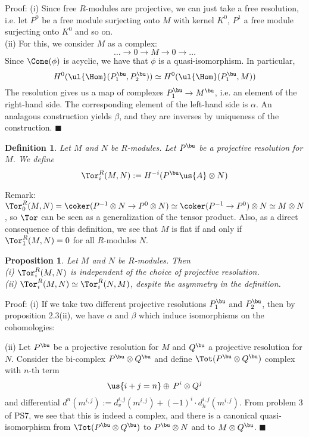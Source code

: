 \documentclass[10 pt]{article}
\newtheorem{prop}{Proposition}[section]
\newtheorem{defn}{Definition}[section]
\newcommand\bdefn{\begin{defn}}
\newcommand\bprop{\begin{prop}}
\newcommand\edefn{\end{defn}}
\newcommand\eprop{\end{prop}}
\begin{document}
Proof: (i) Since free $R$-modules are projective, we can just take a free resolution, i.e. let $P^0$ be a free module surjecting onto $M$ with kernel $K^0$, $P^1$ a free module surjecting onto $K^0$ and so on.\\
(ii) For this, we consider $M$ as a complex:
$$\dots\rightarrow 0\rightarrow M\rightarrow 0\rightarrow \dots$$
Since $\Cone (\phi)$ is acyclic, we have that $\phi$ is a quasi-isomorphism.  In particular,
$$H^0(\ul{\Hom}(P_1^\bu,P_2^\bu))\simeq H^0(\ul{\Hom}(P_1^\bu,M))$$
The resolution gives us a map of complexes $P_1^\bu\rightarrow M^\bu$, i.e. an element of the right-hand side.  The corresponding element of the left-hand side is $\alpha$.  An analagous construction yields $\beta$, and they are inverses by uniqueness of the construction. $\blacksquare$

\bdefn Let $M$ and $N$ be $R$-modules.  Let $P^\bu$ be a projective resolution for $M$.  We define
$$\Tor^R_i(M,N):= H^{-i}(P^\bu\us{A}\otimes N)$$
\edefn

Remark:  $\Tor^R_0(M,N)=\coker(P^{-1}\otimes N\rightarrow P^0\otimes N)\simeq \coker(P^{-1}\rightarrow P^0)\otimes N\simeq M\otimes N$, so $\Tor$ can be seen as a generalization of the tensor product.  Also, as a direct consequence of this definition, we see that $M$ is flat if and only if $\Tor^R_1(M,N)=0$ for all $R$-modules $N$.

\bprop Let $M$ and $N$ be $R$-modules.  Then\\
(i) $\Tor^R_i(M,N)$ is independent of the choice of projective resolution.\\
(ii) $\Tor^R_i(M,N)\simeq\Tor^R_i(N,M)$, despite the asymmetry in the definition.
\eprop

Proof: (i) If we take two different projective resolutions $P_1^\bu$ and $P_2^\bu$, then by proposition 2.3(ii), we have $\alpha$ and $\beta$ which induce isomorphisms on the cohomologies:\\


(ii) Let $P^\bu$ be a projective resolution for $M$ and $Q^\bu$ a projective resolution for $N$.  Consider the bi-complex $P^\bu\otimes Q^\bu$ and define $\Tot(P^\bu\otimes Q^\bu)$ complex with $n$-th term
$$\us{i+j=n}\oplus\, P^i\otimes Q^j $$
and differential $d^n(m^{i,j}):= d_v^{i,j}(m^{i,j})+(-1)^i\cdot d_h^{i,j}(m^{i,j})$.  From problem 3 of PS7, we see that this is indeed a complex, and there is a canonical quasi-isomorphism from $\Tot(P^\bu\otimes Q^\bu)$ to $P^\bu\otimes N$ and to $M\otimes Q^\bu$. $\blacksquare$
\end{document}
